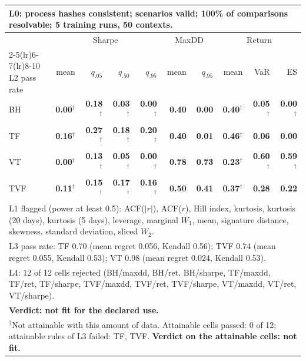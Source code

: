 \begin{tabular}{lrrrrrrrrr}
\toprule
\multicolumn{10}{p{13.5cm}}{L0: process hashes consistent; scenarios valid; 100\% of comparisons resolvable; 5 training runs, 50 contexts.} \\
\midrule
 & \multicolumn{4}{c}{Sharpe} & \multicolumn{2}{c}{MaxDD} & \multicolumn{3}{c}{Return} \\
\cmidrule(lr){2-5}\cmidrule(lr){6-7}\cmidrule(lr){8-10}
L2 pass rate & mean & $q_{.05}$ & $q_{.50}$ & $q_{.95}$ & mean & $q_{.95}$ & mean & VaR & ES \\
\midrule
BH & \textbf{0.00}$^{\dagger}$ & \textbf{0.18}$^{\dagger}$ & \textbf{0.03}$^{\dagger}$ & \textbf{0.00}$^{\dagger}$ & \textbf{0.40} & \textbf{0.00} & \textbf{0.40}$^{\dagger}$ & \textbf{0.05}$^{\dagger}$ & \textbf{0.00}$^{\dagger}$ \\
TF & \textbf{0.16}$^{\dagger}$ & \textbf{0.27}$^{\dagger}$ & \textbf{0.18}$^{\dagger}$ & \textbf{0.20}$^{\dagger}$ & \textbf{0.40} & \textbf{0.01} & \textbf{0.46}$^{\dagger}$ & \textbf{0.06} & \textbf{0.00} \\
VT & \textbf{0.00}$^{\dagger}$ & \textbf{0.13}$^{\dagger}$ & \textbf{0.05}$^{\dagger}$ & \textbf{0.00}$^{\dagger}$ & \textbf{0.78} & \textbf{0.73} & \textbf{0.23}$^{\dagger}$ & \textbf{0.60}$^{\dagger}$ & \textbf{0.59}$^{\dagger}$ \\
TVF & \textbf{0.11}$^{\dagger}$ & \textbf{0.15}$^{\dagger}$ & \textbf{0.17}$^{\dagger}$ & \textbf{0.16}$^{\dagger}$ & \textbf{0.50} & \textbf{0.41} & \textbf{0.37}$^{\dagger}$ & \textbf{0.28} & \textbf{0.22} \\
\midrule
\multicolumn{10}{p{13.5cm}}{L1 flagged (power at least 0.5): ACF($|r|$), ACF($r$), Hill index, kurtosis, kurtosis (20 days), kurtosis (5 days), leverage, marginal $W_1$, mean, signature distance, skewness, standard deviation, sliced $W_2$.} \\
\multicolumn{10}{p{13.5cm}}{L3 pass rate: TF 0.70 (mean regret 0.056, Kendall 0.56); TVF 0.74 (mean regret 0.055, Kendall 0.53); VT 0.98 (mean regret 0.024, Kendall 0.53).} \\
\multicolumn{10}{p{13.5cm}}{L4: 12 of 12 cells rejected (BH/maxdd, BH/ret, BH/sharpe, TF/maxdd, TF/ret, TF/sharpe, TVF/maxdd, TVF/ret, TVF/sharpe, VT/maxdd, VT/ret, VT/sharpe).} \\
\multicolumn{10}{p{13.5cm}}{\textbf{Verdict: not fit for the declared use.}} \\
\multicolumn{10}{p{13.5cm}}{$^{\dagger}$Not attainable with this amount of data. Attainable cells passed: 0 of 12; attainable rules of L3 failed: TF, TVF. \textbf{Verdict on the attainable cells: not fit.}} \\
\bottomrule
\end{tabular}

